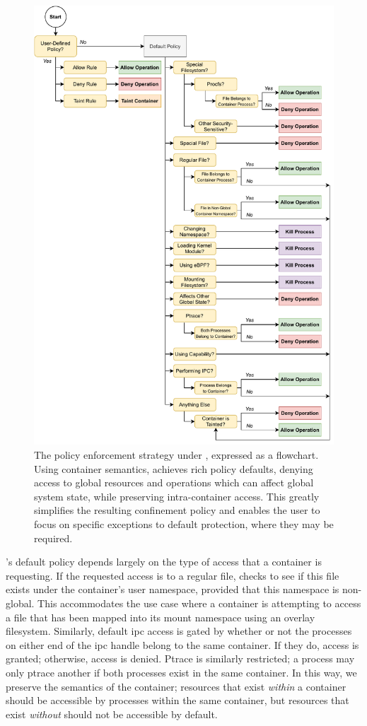\begin{figure}[p]
  \centering
  \includegraphics[width=0.8\linewidth]{figs/bpfcontain/enforcement.pdf}
  \caption[The policy enforcement strategy under \bpfcontain{}]{
    The policy enforcement strategy under \bpfcontain{}, expressed as a flowchart. Using
    container semantics, \bpfcontain{} achieves rich policy defaults, denying access to
    global resources and operations which can affect global system state, while preserving
    intra-container access. This greatly simplifies the resulting confinement policy and
    enables the user to focus on specific exceptions to default protection, where they may
    be required.
  }%
  \label{fig:bpfcontain-enforcement}
\end{figure}

\bpfcontain{}'s default policy depends largely on the type of access that a container is
requesting. If the requested access is to a regular file, \bpfcontain{} checks to see if
this file exists under the container's user namespace, provided that this namespace is
non-global. This accommodates the use case where a container is attempting to access
a file that has been mapped into its mount namespace using an overlay filesystem.
Similarly, default \gls{ipc} access is gated by whether or not the processes on either end
of the \gls{ipc} handle belong to the same container. If they do, access is granted;
otherwise, access is denied. Ptrace is similarly restricted; a process may only ptrace
another if both processes exist in the same container. In this way, we preserve the
semantics of the container; resources that exist \textit{within} a container should be
accessible by processes within the same container, but resources that exist
\textit{without} should not be accessible by default.

